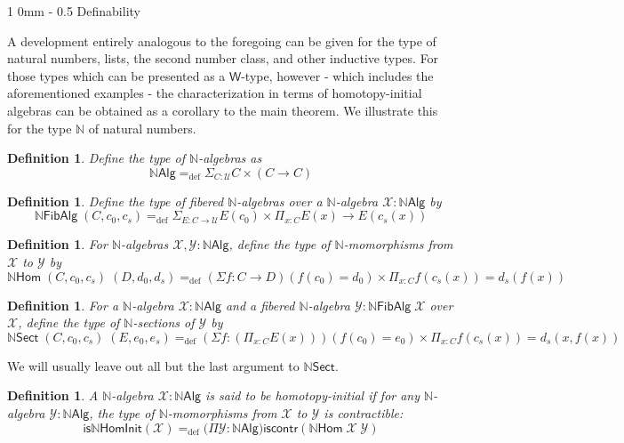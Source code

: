 \documentclass[10pt,a4paper,oneside,reqno]{amsart}
\makeatletter
\numberwithin{equation}{section}
\renewcommand{\section}{\@startsection
  {section}%
   {1}%
  {0mm}%
   {-\baselineskip}%
  {0.5\baselineskip}%
   {\Large\bfseries}}%
\theoremstyle{mythm}
\theoremstyle{mydef}
\newtheorem{definition}[theorem]{Definition}
\theoremstyle{myrmk}
\newcommand{\defeq}{=_{\mathrm{def}}}
\newcommand{\iscontr}{\mathsf{iscontr}}
\newcommand{\U}{\mathcal{U}}
\newcommand{\prd}[1]{\Pi_{#1}}
\newcommand{\sm}[1]{\Sigma_{#1}}
\newcommand{\nat}{\ensuremath{\mathbb{N}}}
\newcommand{\W}{\mathsf{W}}
\newcommand{\NatAlg}{\nat\mathsf{Alg}}
\newcommand{\NatHom}{\nat\mathsf{Hom}}
\newcommand{\NatFibAlg}{\nat\mathsf{FibAlg}}
\newcommand{\NatFibHom}{\nat\mathsf{Sect}}
\newcommand{\IsNatHInit}{\mathsf{is}\nat\mathsf{HomInit}}
\newcommand{\X}{\mathcal{X}}
\newcommand{\Y}{\mathcal{Y}}
\makeatother
\begin{document}
\section{Definability}
\label{sec:definability}

A development entirely analogous to the foregoing can be given for the type of natural numbers, lists, the second number class, and other inductive types. For those types which can be presented as a $\W$-type, however - which includes the aforementioned examples - the characterization in terms of homotopy-initial algebras can be obtained as a corollary to the main theorem. We illustrate this for the type $\nat$ of natural numbers.

\begin{definition}\label{def:NatAlg}
Define the type of \emph{$\nat$-algebras} as 
\[\NatAlg \defeq \sm{C : \U} C \times (C \to C) \]
\end{definition}

\begin{definition}\label{def:NatFibAlg}
Define the type of \emph{fibered $\nat$-algebras} over a $\nat$-algebra $\X : \NatAlg$ by
\[\NatFibAlg \; (C,c_0,c_s) \defeq \sm{E : C \to \U} E(c_0) \times \prd{x:C} E(x) \to E(c_s(x)) \]
\end{definition}

\begin{definition}\label{def:NatHom}
For $\nat$-algebras $\X,\Y: \NatAlg$, define the type of \emph{$\nat$-momorphisms} from $\X$ to $\Y$ by 
\[\NatHom \; (C,c_0,c_s) \; (D,d_0,d_s) \defeq (\Sigma f:C \to D) (f(c_0) = d_0) \times \prd{x:C} f(c_s(x)) = d_s(f(x)) \]
\end{definition}

\begin{definition}\label{def:NatFibHom}
For a $\nat$-algebra $\X : \NatAlg$ and a fibered $\nat$-algebra $\Y : \NatFibAlg \; \X$ over $\X$, define the type of \emph{$\nat$-sections} of $\Y$ by
\[\NatFibHom \; (C,c_0,c_s) \; (E,e_0,e_s) \defeq (\Sigma f:(\prd{x:C} E(x))) (f(c_0) = e_0) \times \prd{x:C} f(c_s(x)) = d_s(x,f(x)) \]
\end{definition}
We will usually leave out all but the last argument to $\NatFibHom$.

\begin{definition}\label{def:NatHInit}
A $\nat$-algebra $\X : \NatAlg$ is said to be \emph{homotopy-initial} if for any $\nat$-algebra $\Y : \NatAlg$, the type of $\nat$-momorphisms from $\X$ to $\Y$ is contractible:
\[ \IsNatHInit(\X) \defeq \big(\Pi \Y:\NatAlg\big) \iscontr(\NatHom \; \X \; \Y) \]  
\end{definition}
\end{document}
